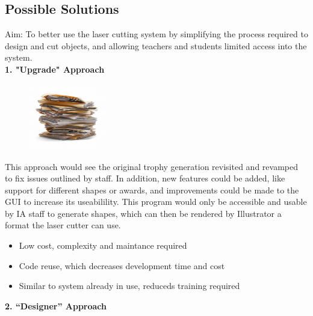 \documentclass[oneside,openany,11pt,a4paper]{report}
\begin{document}
\subsection{Possible Solutions}
Aim: To better use the laser cutting system by simplifying the process required to design and cut objects, and allowing teachers and students limited access into the system.\\


\noindent \textbf{1.  "Upgrade" Approach}

\begin{figure} \centering \includegraphics[width=0.3\textwidth]{sol1.png} \end{figure} 
This approach would see the original trophy generation revisited and revamped to fix issues outlined by staff. In addition, new features could be added, like support for different shapes or awards, and improvements could be made to the GUI to increase its useabilility. This program would only be accessible and usable by IA staff to generate shapes, which can then be rendered by Illustrator a format the laser cutter can use.
	\begin{itemize}
		\itemsep0em
		\item Low cost, complexity and maintance required
		\item Code reuse, which decreases development time and cost
		\item Similar to system already in use, reduceds training required
	\end{itemize} 

\noindent \textbf{2. “Designer” Approach }
\end{document}
